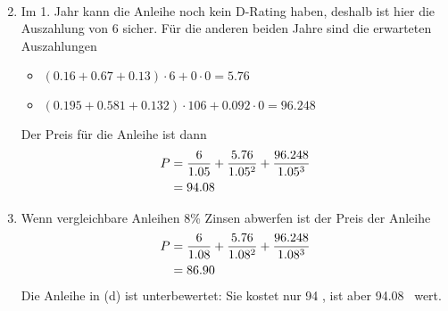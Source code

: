 \documentclass{article}
\begin{document}
\begin{enumerate}[label=(\alph*)]
\begin{align}
		\end{align}
		\item Im 1. Jahr kann die Anleihe noch kein D-Rating haben, deshalb ist hier die Auszahlung von 6 sicher. Für die anderen beiden Jahre sind die erwarteten Auszahlungen
		\begin{itemize}
			\item $(0.16 + 0.67 + 0.13)\cdot 6 + 0\cdot 0 = 5.76$
			\item $(0.195 + 0.581 + 0.132)\cdot 106 + 0.092\cdot 0 = 96.248$
		\end{itemize}
		Der Preis für die Anleihe ist dann
		\begin{align}
			P &= \frac{6}{1.05} + \frac{5.76}{1.05^2} + \frac{96.248}{1.05^3} \notag \\
			&= 94.08 \notag
		\end{align}
		\item Wenn vergleichbare Anleihen 8\% Zinsen abwerfen ist der Preis der Anleihe
		\begin{align}
			P &= \frac{6}{1.08} + \frac{5.76}{1.08^2} + \frac{96.248}{1.08^3} \notag \\
			&= 86.90 \notag
		\end{align}
		Die Anleihe in (d) ist unterbewertet: Sie kostet nur 94 \EUR, ist aber 94.08 \EUR\, wert.
	\end{enumerate}
	
\end{document}
